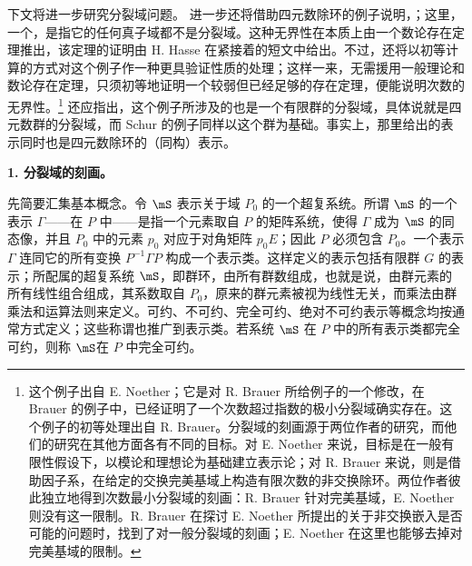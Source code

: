 下文将进一步研究分裂域问题。 进一步还将借助四元数除环的例子说明，；这里，一个，是指它的任何真子域都不是分裂域。这种无界性在本质上由一个数论存在定理推出，该定理的证明由 H. Hasse 在紧接着的短文中给出。不过，还将以初等计算的方式对这个例子作一种更具验证性质的处理；这样一来，无需援用一般理论和数论存在定理，只须初等地证明一个较弱但已经足够的存在定理，便能说明次数的无界性。\footnote{这个例子出自 E. Noether；它是对 R. Brauer 所给例子的一个修改，在 Brauer 的例子中，已经证明了一个次数超过指数的极小分裂域确实存在。这个例子的初等处理出自 R. Brauer。分裂域的刻画源于两位作者的研究，而他们的研究在其他方面各有不同的目标。对 E. Noether 来说，目标是在一般有限性假设下，以模论和理想论为基础建立表示论；对 R. Brauer 来说，则是借助因子系，在给定的交换完美基域上构造有限次数的非交换除环。两位作者彼此独立地得到次数最小分裂域的刻画：R. Brauer 针对完美基域，E. Noether 则没有这一限制。R. Brauer 在探讨 E. Noether 所提出的关于非交换嵌入是否可能的问题时，找到了对一般分裂域的刻画；E. Noether 在这里也能够去掉对完美基域的限制。} 还应指出，这个例子所涉及的也是一个有限群的分裂域，具体说就是四元数群的分裂域，而 Schur 的例子同样以这个群为基础。事实上，那里给出的表示同时也是四元数除环的（同构）表示。

\begin{center}
\textbf{1. 分裂域的刻画。}
\end{center}

先简要汇集基本概念。令 $\mS$ 表示关于域 $P_0$ 的一个超复系统。所谓 $\mS$ 的一个表示 $\Gamma$——在 $P$ 中——是指一个元素取自 $P$ 的矩阵系统，使得 $\Gamma$ 成为 $\mS$ 的同态像，并且 $P_0$ 中的元素 $p_0$ 对应于对角矩阵 $p_0E$；因此 $P$ 必须包含 $P_0$。一个表示 $\Gamma$ 连同它的所有变换 $P^{-1}\Gamma P$ 构成一个表示类。这样定义的表示包括有限群 $G$ 的表示；所配属的超复系统 $\mS$，即\guillemotright{}群环\guillemotleft{}，由所有\guillemotright{}群数\guillemotleft{}组成，也就是说，由群元素的所有线性组合组成，其系数取自 $P_0$，原来的群元素被视为线性无关，而乘法由群乘法和运算法则来定义。\guillemotright{}可约\guillemotleft{}、\guillemotright{}不可约\guillemotleft{}、\guillemotright{}完全可约\guillemotleft{}、\guillemotright{}绝对不可约\guillemotleft{}表示等概念均按通常方式定义；这些称谓也推广到表示类。若系统 $\mS$ 在 $P$ 中的所有表示类都完全可约，则称 $\mS$\guillemotright{}在 $P$ 中完全可约\guillemotleft{}。

